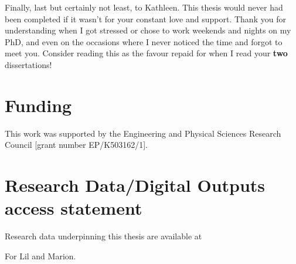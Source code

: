 \documentclass[10pt,a4paper,twoside]{book}
\begin{document}
Finally, last but certainly not least, to Kathleen.
This thesis would never had been completed if it wasn't for your constant love and support.
Thank you for understanding when I got stressed or chose to work weekends and nights on my PhD, and even on the occasions where I never noticed the time and forgot to meet you.
\noindent Consider reading this as the favour repaid for when I read your \textbf{two} dissertations!

\newpage
\section*{Funding}

This work was supported by the Engineering and Physical Sciences Research Council [grant number EP/K503162/1].

\section*{Research Data/Digital Outputs access statement}


Research data underpinning this thesis are available at 
\null\newpage
\null\newpage
\null\newpage
\begin{center}
    \vspace*{\fill}
    For Lil and Marion.
    \vspace*{\fill}
\end{center}
\clearpage
\null\newpage

\tableofcontents
\printnoidxglossaries
\newpage

\renewcommand{\cftdotsep}{\cftnodots}%

\listoffigures
{}

\mainmatter











\end{document}
